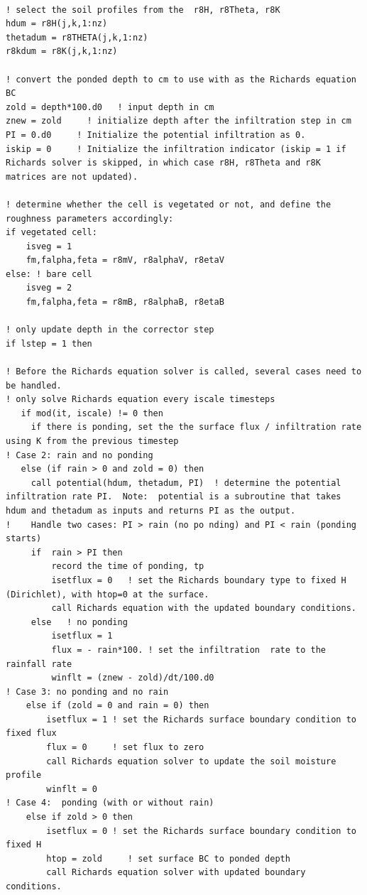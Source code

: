 \documentclass{article}
\begin{document}
\begin{lstlisting}

! select the soil profiles from the  r8H, r8Theta, r8K 
hdum = r8H(j,k,1:nz)
thetadum = r8THETA(j,k,1:nz)   
r8kdum = r8K(j,k,1:nz) 

! convert the ponded depth to cm to use with as the Richards equation BC
zold = depth*100.d0   ! input depth in cm
znew = zold     ! initialize depth after the infiltration step in cm
PI = 0.d0     ! Initialize the potential infiltration as 0.
iskip = 0     ! Initialize the infiltration indicator (iskip = 1 if Richards solver is skipped, in which case r8H, r8Theta and r8K  matrices are not updated). 

! determine whether the cell is vegetated or not, and define the roughness parameters accordingly:
if vegetated cell:
    isveg = 1
    fm,falpha,feta = r8mV, r8alphaV, r8etaV
else: ! bare cell
	isveg = 2
    fm,falpha,feta = r8mB, r8alphaB, r8etaB	

! only update depth in the corrector step
if lstep = 1 then

! Before the Richards equation solver is called, several cases need to be handled. 
! only solve Richards equation every iscale timesteps
   if mod(it, iscale) != 0 then 
     if there is ponding, set the the surface flux / infiltration rate using K from the previous timestep
! Case 2: rain and no ponding
   else (if rain > 0 and zold = 0) then
     call potential(hdum, thetadum, PI)  ! determine the potential infiltration rate PI.  Note:  potential is a subroutine that takes hdum and thetadum as inputs and returns PI as the output.
!    Handle two cases: PI > rain (no po	nding) and PI < rain (ponding starts)
     if  rain > PI then
         record the time of ponding, tp
	     isetflux = 0   ! set the Richards boundary type to fixed H (Dirichlet), with htop=0 at the surface.
	     call Richards equation with the updated boundary conditions.	   
     else 	! no ponding
     	 isetflux = 1
     	 flux = - rain*100. ! set the infiltration 	rate to the rainfall rate       
	     winflt = (znew - zold)/dt/100.d0 
! Case 3: no ponding and no rain
    else if (zold = 0 and rain = 0) then
	    isetflux = 1 ! set the Richards surface boundary condition to fixed flux
		flux = 0     ! set flux to zero
		call Richards equation solver to update the soil moisture profile
		winflt = 0
! Case 4:  ponding (with or without rain)
	else if zold > 0 then
	    isetflux = 0 ! set the Richards surface boundary condition to fixed H
		htop = zold     ! set surface BC to ponded depth
		call Richards equation solver with updated boundary conditions.
	    

\end{lstlisting}
\end{document}
